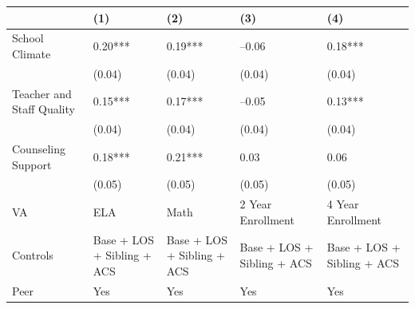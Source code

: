 \documentclass{article}
\begin{document}
\begin{table}[tbp] \centering
{}

{\footnotesize
\begin{tabularx}{\linewidth}{lCCCC}

\toprule
&{(1)}&{(2)}&{(3)}&{(4)} \tabularnewline
\midrule \addlinespace[\belowrulesep]
School Climate&0.20***&0.19***&--0.06&0.18*** \tabularnewline
&(0.04)&(0.04)&(0.04)&(0.04) \tabularnewline
Teacher and Staff Quality&0.15***&0.17***&--0.05&0.13*** \tabularnewline
&(0.04)&(0.04)&(0.04)&(0.04) \tabularnewline
Counseling Support&0.18***&0.21***&0.03&0.06 \tabularnewline
&(0.05)&(0.05)&(0.05)&(0.05) \tabularnewline
\midrule VA&ELA&Math&2 Year Enrollment&4 Year Enrollment \tabularnewline
Controls&Base + LOS + Sibling + ACS&Base + LOS + Sibling + ACS&Base + LOS + Sibling + ACS&Base + LOS + Sibling + ACS \tabularnewline
Peer&Yes&Yes&Yes&Yes \tabularnewline
\bottomrule 

\end{tabularx}
}
\end{table}
\end{document}
